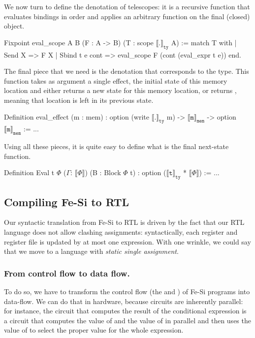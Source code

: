 \documentclass{llncs}
\newcommand{\denote}[1]{\llbracket #1 \rrbracket}
\newcommand{\denotety}[1]{\denote{\mathtt{#1}}_{\mathtt{ty}}}
\newcommand{\denotemem}[1]{\denote{\mathtt{#1}}_{\mathtt{mem}}}
\begin{document}
We now turn to define the denotation of telescopes: it is a
recursive function that evaluates bindings in order and applies
an arbitrary function on the final (closed) object. 
\begin{mcoq}
Fixpoint eval_scope {A B} (F : A -> B) (T : scope $\denotety{.}$ A) :=
match T with 
| Send X => F X
| Sbind t e cont => eval_scope F (cont (eval_expr t e))
end.   
\end{mcoq}
%
The final piece that we need is the denotation that corresponds to the
 type. This function takes as argument a single effect,
the initial state of this memory location  and either returns a new
state for this memory location, or returns , meaning that
location is left in its previous state.
\begin{mcoq}
Definition eval_effect (m : mem) : option (write $\denotety{.}$ m) -> $\denotemem{m}$ -> option $\denotemem{m}$ := ... 
\end{mcoq}
%
Using all these pieces, it is quite easy to define what is the final
next-state function. 
\begin{mcoq}
Definition Eval {t} {$\Phi$} ($\Gamma$: $\denote{\Phi}$) (B : Block $\Phi$ t) : option ($\denotety{t}$ * $\denote{\Phi}$) := ...
\end{mcoq}

\subsection{Compiling Fe-Si to RTL} 
Our syntactic translation from Fe-Si to RTL is driven by the fact that
our RTL language does not allow clashing assignments: syntactically,
each register and register file is updated by at most one 
expression.
%
With one wrinkle, we could say that we move to a language with
\emph{static single assignment}. 

\subsubsection{From control flow to data flow.}To do so, we have to
transform the control flow (the  and ) of
Fe-Si programs into data-flow.
%
We can do that in hardware, because circuits are inherently parallel:
for instance, the circuit that computes the result of the conditional
expression \mbox{} is a circuit that computes the
value of  and the value of  in parallel and then uses
the value of  to select the proper value for the whole
expression.
\end{document}
